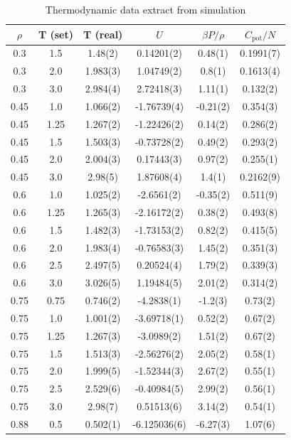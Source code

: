 \documentclass[aps,prl,reprint,groupedaddress]{revtex4-1}
\begin{document}
\begingroup
\squeezetable
\begin{table}[ht]%
\caption{Thermodynamic data extract from simulation\label{thermo_data}}
\begin{ruledtabular}
\begin{tabular}{ c  c  c  c  c  c }
$\rho$ & T (set) & T (real) & $U$ & $\beta P/\rho$ & $C_{\text{pot}}/N$ \\ \hline
0.3 & 1.5 & 1.48(2) & 0.14201(2) & 0.48(1) & 0.1991(7) \\ 
0.3 & 2.0 & 1.983(3) & 1.04749(2) & 0.8(1) & 0.1613(4) \\ 
0.3 & 3.0 & 2.984(4) & 2.72418(3) & 1.11(1) & 0.132(2) \\ 
0.45 & 1.0 & 1.066(2) & -1.76739(4) & -0.21(2) & 0.354(3) \\ 
0.45 & 1.25 & 1.267(2) & -1.22426(2) & 0.14(2) & 0.286(2) \\ 
0.45 & 1.5 & 1.503(3) & -0.73728(2) & 0.49(2) & 0.293(2) \\ 
0.45 & 2.0 & 2.004(3) & 0.17443(3) & 0.97(2) & 0.255(1) \\ 
0.45 & 3.0 & 2.98(5) & 1.87608(4) & 1.4(1) & 0.2162(9) \\ 
0.6 & 1.0 & 1.025(2) & -2.6561(2) & -0.35(2) & 0.511(9) \\ 
0.6 & 1.25 & 1.265(3) & -2.16172(2) & 0.38(2) & 0.493(8) \\ 
0.6 & 1.5 & 1.482(3) & -1.73153(2) & 0.82(2) & 0.415(5) \\ 
0.6 & 2.0 & 1.983(4) & -0.76583(3) & 1.45(2) & 0.351(3) \\ 
0.6 & 2.5 & 2.497(5) & 0.20524(4) & 1.79(2) & 0.339(3) \\ 
0.6 & 3.0 & 3.026(5) & 1.19484(5) & 2.01(2) & 0.314(2) \\ 
0.75 & 0.75 & 0.746(2) & -4.2838(1) & -1.2(3) & 0.73(2) \\ 
0.75 & 1.0 & 1.001(2) & -3.69718(1) & 0.52(2) & 0.67(2) \\ 
0.75 & 1.25 & 1.267(3) & -3.0989(2) & 1.51(2) & 0.67(2) \\ 
0.75 & 1.5 & 1.513(3) & -2.56276(2) & 2.05(2) & 0.58(1) \\ 
0.75 & 2.0 & 1.999(5) & -1.52344(3) & 2.67(2) & 0.55(1) \\ 
0.75 & 2.5 & 2.529(6) & -0.40984(5) & 2.99(2) & 0.56(1) \\ 
0.75 & 3.0 & 2.98(7) & 0.51513(6) & 3.14(2) & 0.54(1) \\ 
0.88 & 0.5 & 0.502(1) & -6.125036(6) & -6.27(3) & 1.07(6) \\ 

\end{tabular}
\end{ruledtabular}
\end{table}
\end{document}

